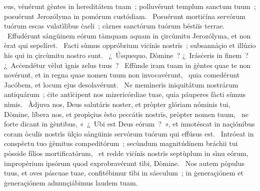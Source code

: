 \psalmChapterWithInscription{}
{ }
{%
eus, vënérunt ġèntes in hereditátem tuam~; polluvérunt templum sanctum tuum~; posuérunt Jerozólyma in pomórum custódiam. 
~Posuérunt mortiċína servórum tuórum escas vulatìlibus ċaeli~; càrnes sanctórum tuórum béstiïs terrae. 
~Effudérunt sángüinem eórum tàmquam aquam in çircùmitu Jerozólyma, et non èrat qui sepelíret. 
~Facti sùmus oppróbrium viċínïs nostrïs~; subsannáçio et illúzio hïs qui in çircùmitu nostro sunt. 
~¿~Úsquequo, Dòmine~? ¿~Irásċeris in finem~? ¿~Acċendétur vèlut ìgnis zelus tuus~? 
~Effùnde iram tuam in ġèntes quae te non novérunt, et in regna quae nomen tuum non invocavérunt, 
~quia comedérunt Jacóbem, et locum ejus desolavérunt. 
~Ne memìnerïs iniquitátum nostrárum antiquárum~; ċite antìċipent nos mizericórdiae tuae, quia páuperes fàcti sùmus nìmis. 
~Àdjuva nos, Deus salutáris noster, et pròpter glóriam nóminis tui, Dòmine, líbera nos, et propìçius èsto peccátïs nostrïs, pròpter nomen tuum, 
~ne forte dicant in ġèntibus, «~¿~Ubi est Deus eórum~?~», et innotéscat in naçiónibus coram òculïs nostrïs ùlçio sángüinis servórum tuórum qui effúsus est. 
~Intróeat in conspèctu tuo ġèmitus compeditórum~; secùndum magnitúdinem bráchii tui pòsside fílios mortificatórum, 
~et redde viċínïs nostrïs septùplum in sìnu eórum, impropèrium ipsórum quod exprobravérunt tìbi, Dòmine. 
~Nos autem pòpulus tuus, et oves páscuae tuae, confitébimur tìbi in sáeculum~; in ġeneraçiónem et ġeneraçiónem adnunçiábimus laudem tuam. 
}
